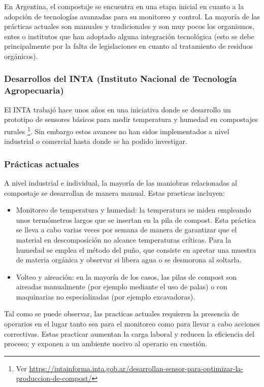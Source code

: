 En Argentina, el compostaje se encuentra en una etapa inicial en cuanto a la adopción de tecnologías avanzadas para su monitoreo y control. La mayoría de las prácticas actuales son manuales y tradicionales y son muy pocos los organismos, entes o institutos que han adoptado alguna integración tecnológica (esto se debe principalmente por la falta de legislaciones en cuanto al tratamiento de residuos orgánicos).

\subsubsection{Desarrollos del INTA (Instituto Nacional de Tecnología Agropecuaria)}

El INTA trabajó hace unos años en una iniciativa donde se desarrollo un prototipo de sensores básicos para medir temperatura y humedad en compostajes rurales \footnote{Ver \url{https://intainforma.inta.gob.ar/desarrollan-sensor-para-optimizar-la-produccion-de-compost/}}. Sin embargo estos avances no han sidos implementados a nivel industrial o comercial hasta donde se ha podido investigar.

\subsubsection{Prácticas actuales}
A nivel industrial e individual, la mayoría de las maniobras relacionadas al compostaje se desarrollan de manera manual. Estas practicas incluyen:
\begin{itemize}
    \item Monitoreo de temperatura y humedad: la temperatura se miden empleando unos termómetros largos que se insertan en la pila de compost. Esta práctica se lleva a cabo varias veces por semana de manera de garantizar que el material en descomposición no alcance temperaturas críticas. Para la humedad se emplea el método del puño, que consiste en apretar una muestra de materia orgánica y observar si libera agua o se desmorona al soltarla.
    \item Volteo y aireación: en la mayoría de los casos, las pilas de compost son aireadas manualmente (por ejemplo mediante el uso de palas) o con maquinarias no especializadas (por ejemplo excavadoras).
\end{itemize}

Tal como se puede observar, las practicas actuales requieren la presencia de operarios en el lugar tanto sea para el monitoreo como para llevar a cabo acciones correctivas. Estas practicar aumentan la carga laboral y reducen la eficiencia del proceso; y exponen a un ambiente nocivo al operario en cuestión.

